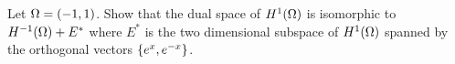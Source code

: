 Let $\Omega = (-1, 1)$.
Show that the dual space of $H^1(\Omega)$ is isomorphic to $H^{-1}(\Omega) + E^*$
where $E^*$ is the two dimensional subspace of $H^1(\Omega)$ spanned by the orthogonal vectors $\{ e^x, e^{-x} \}$.

